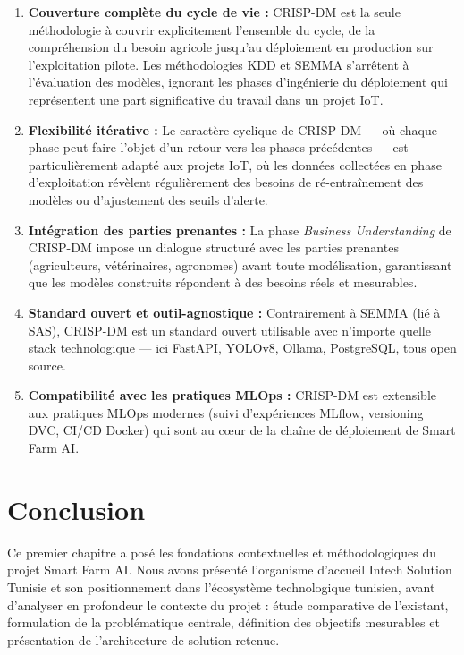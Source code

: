 \documentclass[12pt, a4paper]{report}
\begin{document}
\begin{enumerate}[leftmargin=*, label=\textcolor{primary}{\arabic*.}]
    \item \textbf{Couverture complète du cycle de vie :} CRISP-DM est la seule méthodologie à couvrir explicitement l'ensemble du cycle, de la compréhension du besoin agricole jusqu'au déploiement en production sur l'exploitation pilote. Les méthodologies KDD et SEMMA s'arrêtent à l'évaluation des modèles, ignorant les phases d'ingénierie du déploiement qui représentent une part significative du travail dans un projet IoT.

    \item \textbf{Flexibilité itérative :} Le caractère cyclique de CRISP-DM — où chaque phase peut faire l'objet d'un retour vers les phases précédentes — est particulièrement adapté aux projets IoT, où les données collectées en phase d'exploitation révèlent régulièrement des besoins de ré-entraînement des modèles ou d'ajustement des seuils d'alerte.

    \item \textbf{Intégration des parties prenantes :} La phase \textit{Business Understanding} de CRISP-DM impose un dialogue structuré avec les parties prenantes (agriculteurs, vétérinaires, agronomes) avant toute modélisation, garantissant que les modèles construits répondent à des besoins réels et mesurables.

    \item \textbf{Standard ouvert et outil-agnostique :} Contrairement à SEMMA (lié à SAS), CRISP-DM est un standard ouvert utilisable avec n'importe quelle stack technologique — ici FastAPI, YOLOv8, Ollama, PostgreSQL, tous open source.

    \item \textbf{Compatibilité avec les pratiques MLOps :} CRISP-DM est extensible aux pratiques MLOps modernes (suivi d'expériences MLflow, versioning DVC, CI/CD Docker) qui sont au cœur de la chaîne de déploiement de Smart Farm AI.
\end{enumerate}

\section{Conclusion}

Ce premier chapitre a posé les fondations contextuelles et méthodologiques du projet Smart Farm AI. Nous avons présenté l'organisme d'accueil Intech Solution Tunisie et son positionnement dans l'écosystème technologique tunisien, avant d'analyser en profondeur le contexte du projet : étude comparative de l'existant, formulation de la problématique centrale, définition des objectifs mesurables et présentation de l'architecture de solution retenue.
\end{document}
